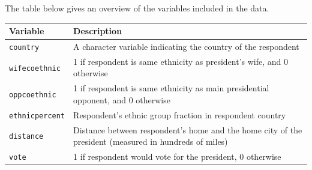 \documentclass[]{article}
\theoremstyle{definition}
\theoremstyle{definition}
\theoremstyle{definition}
\theoremstyle{remark}
\begin{document}
The table below gives an overview of the variables included in the data.

\begin{longtable}[]{@{}ll@{}}
\toprule
\begin{minipage}[b]{0.10\columnwidth}\raggedright\strut
Variable\strut
\end{minipage} & \begin{minipage}[b]{0.84\columnwidth}\raggedright\strut
Description\strut
\end{minipage}\tabularnewline
\midrule
\endhead
\begin{minipage}[t]{0.10\columnwidth}\raggedright\strut
\texttt{country}\strut
\end{minipage} & \begin{minipage}[t]{0.84\columnwidth}\raggedright\strut
A character variable indicating the country of the respondent\strut
\end{minipage}\tabularnewline
\begin{minipage}[t]{0.10\columnwidth}\raggedright\strut
\texttt{wifecoethnic}\strut
\end{minipage} & \begin{minipage}[t]{0.84\columnwidth}\raggedright\strut
1 if respondent is same ethnicity as president's wife, and 0
otherwise\strut
\end{minipage}\tabularnewline
\begin{minipage}[t]{0.10\columnwidth}\raggedright\strut
\texttt{oppcoethnic}\strut
\end{minipage} & \begin{minipage}[t]{0.84\columnwidth}\raggedright\strut
1 if respondent is same ethnicity as main presidential opponent, and 0
otherwise\strut
\end{minipage}\tabularnewline
\begin{minipage}[t]{0.10\columnwidth}\raggedright\strut
\texttt{ethnicpercent}\strut
\end{minipage} & \begin{minipage}[t]{0.84\columnwidth}\raggedright\strut
Respondent's ethnic group fraction in respondent country\strut
\end{minipage}\tabularnewline
\begin{minipage}[t]{0.10\columnwidth}\raggedright\strut
\texttt{distance}\strut
\end{minipage} & \begin{minipage}[t]{0.84\columnwidth}\raggedright\strut
Distance between respondent's home and the home city of the president
(measured in hundreds of miles)\strut
\end{minipage}\tabularnewline
\begin{minipage}[t]{0.10\columnwidth}\raggedright\strut
\texttt{vote}\strut
\end{minipage} & \begin{minipage}[t]{0.84\columnwidth}\raggedright\strut
1 if respondent would vote for the president, 0 otherwise\strut
\end{minipage}\tabularnewline
\bottomrule
\end{longtable}
\end{document}
